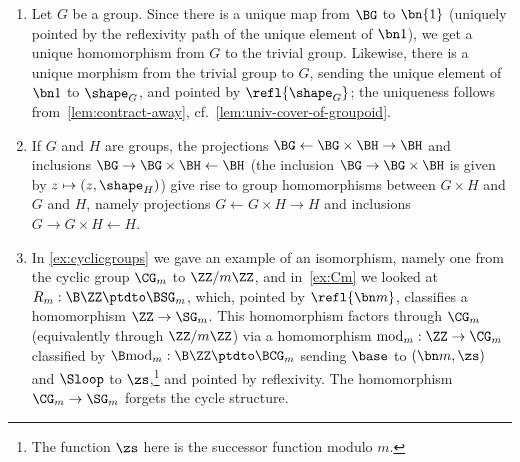 \begin{example}
\begin{enumerate}
    In particular, we get homomorphisms of symmetric groups
    $\SG_m\to\SG_{m+n}$ and $\SG_m\to\SG_{mn}$, induced by identifications
    $\Fin(m+n) \eqto \Fin(m) \coprod \Fin(n)$ and
    $\Fin(mn) \eqto \Fin(m) \times \Fin(n)$.\footnote{%
      The latter identification is somewhat arbitrary, but
      let's say it's defined using the lexicographic ordering
      on the product.}
\item Let $G$ be a group.  Since there is a unique map from $\BG$ to
  $\bn{1} $ (uniquely pointed by the reflexivity path of the unique
  element of $\bn 1$), we get a unique homomorphism from $G$ to the
  trivial group.  Likewise, there is a unique morphism from the
  trivial group to $G$, sending the unique element of $\bn 1$ to
  $\shape_G$, and pointed by $\refl {\shape_G}$;
  the uniqueness follows from~\cref{lem:contract-away},
  cf.\ \cref{lem:univ-cover-of-groupoid}.
\item If $G$ and $H$ are groups, the projections $\BG\gets \BG\times \BH\to \BH$ and inclusions $\BG\to\BG\times\BH\gets\BH$
  (\eg the inclusion $\BG\to\BG\times\BH$ is given by $z\mapsto(z,\shape_H)$)
  give rise to group homomorphisms between $G\times H$ and $G$ and $H$,
  namely projections $G\gets G\times H\to H$ and inclusions
  $G\to G\times H\gets H$.
\item\label{it:mod_m}
  In \cref{ex:cyclicgroups} we gave an example of an isomorphism, 
  namely one from the cyclic group $\CG_m$ to $\ZZ/m\ZZ$,
  and in~\cref{ex:Cm} we looked at $R_m : \B\ZZ \ptdto \BSG_m$,
  which, pointed by $\refl{\bn m}$,
  classifies a homomorphism $\ZZ \to \SG_m$. This homomorphism
  factors through $\CG_m$ (equivalently through $\ZZ/m\ZZ$)
  via a homomorphism $\mathrm{mod}_m : \ZZ \to \CG_m$ classified by 
  $\B\mathrm{mod}_m:\B\ZZ \ptdto \BCG_m$ sending $\base$ to $(\bn m,\zs)$
  and $\Sloop$ to $\zs$,\footnote{%
  The function $\zs$ here is the successor function modulo $m$.} 
  and pointed by reflexivity.
  The homomorphism $\CG_m \to \SG_m$ forgets the
  cycle structure.\qedhere
  \end{enumerate}
\end{example}

